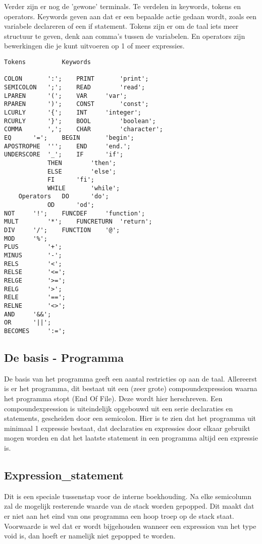 \documentclass[]{article}
\begin{document}
\newpage 

Verder zijn er nog de 'gewone' terminals. Te verdelen in keywords, tokens en operators. Keywords geven aan dat er een bepaalde actie gedaan wordt, zoals een variabele declareren of een if statement. Tokens zijn er om de taal iets meer structuur te geven, denk aan comma's tussen de variabelen. En operators zijn bewerkingen die je kunt uitvoeren op 1 of meer expressies.
\\
\begin{lstlisting}[style=ANTLR]
	Tokens			Keywords
	
COLON		':';	PRINT		'print';
SEMICOLON	';';	READ		'read';
LPAREN		'(';	VAR		'var';
RPAREN		')';	CONST		'const';
LCURLY		'{';	INT		'integer';
RCURLY		'}';	BOOL		'boolean';
COMMA		',';	CHAR		'character';
EQ		'=';	BEGIN		'begin';
APOSTROPHE	''';	END		'end.';
UNDERSCORE	'_';	IF		'if';
			THEN		'then';
			ELSE		'else';
			FI		'fi';
			WHILE		'while';
	Operators	DO		'do';
			OD		'od';
NOT		'!';	FUNCDEF		'function';
MULT		'*';	FUNCRETURN	'return';
DIV		'/';	FUNCTION	'@';
MOD		'%';
PLUS		'+';
MINUS		'-';
RELS		'<';
RELSE		'<=';
RELGE		'>=';
RELG		'>';
RELE		'==';
RELNE		'<>';
AND		'&&';
OR		'||';
BECOMES		':=';
\end{lstlisting}
\newpage

\subsection{De basis - Programma}
De basis van het programma geeft een aantal restricties op aan de taal.
Allereerst is er het programma, dit bestaat uit een (zeer grote) compoundexpression waarna het programma stopt (End Of File). Deze wordt hier herschreven. Een compoundexpression is uiteindelijk opgebouwd uit een serie declaraties en statements, gescheiden door een semicolon. Hier is te zien dat het programma uit minimaal 1 expressie bestaat, dat declaraties en expressies door elkaar gebruikt mogen worden en dat het laatste statement in een programma altijd een expressie is.


\subsection{Expression\_statement}
Dit is een speciale tussenstap voor de interne boekhouding. Na elke semicolumn zal de mogelijk resterende waarde van de stack worden gepopped. Dit maakt dat er niet aan het eind van ons programma een hoop troep op de stack staat. Voorwaarde is wel dat er wordt bijgehouden wanneer een expression van het type void is, dan hoeft er namelijk niet gepopped te worden.

\end{document}
